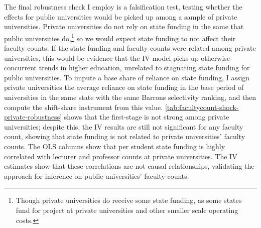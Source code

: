 The final robustness check I employ is a falsification test, testing whether the effects for public universities would be picked up among a sample of private universities.
Private universities do not rely on state funding in the same that public universities do,\footnote{
    Though private universities do receive some state funding, as some states fund for project at private universities and other smaller scale operating costs.
}
so we would expect state funding to not affect their faculty counts.
If the state funding and faculty counts were related among private universities, this would be evidence that the IV model picks up otherwise concurrent trends in higher education, unrelated to stagnating state funding for public universities.
To impute a base share of reliance on state funding, I assign private universities the average reliance on state funding in the base period of universities in the same state with the same Barrons selectivity ranking, and then compute the shift-share instrument from this value.
\autoref{tab:facultycount-shock-private-robustness} shows that the first-stage is not strong among private universities; despite this, the IV results are still not significant for any faculty count, showing that state funding is not related to private universities' faculty counts.
The OLS columns show that per student state funding is highly correlated with lecturer and professor counts at private universities.
The IV estimates show that these correlations are not causal relationships, validating the approach for inference on public universities' faculty counts.
